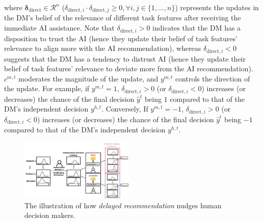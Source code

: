\documentclass[letterpaper]{article} %
\begin{document}
\noindent where $\bm{\delta}_{\text{direct}} \in \mathcal{R}^n$ ($\delta_{\text{direct},i} \cdot \delta_{\text{direct},j} \geq 0,  \forall i, j \in \{1, \dots, n\}
$) represents the updates in the DM's belief of the relevance of different task features after receiving the immediate AI assistance. Note that $\delta_{\text{direct},i}>0$ indicates that the DM has a disposition to trust the AI (hence they update their belief of task features' relevance to align more with the AI recommendation), whereas $\delta_{\text{direct},i}<0$  suggests that the DM has a tendency to distrust AI (hence they update their belief of task features' relevance to deviate more from the AI recommendation). $c^{m,t}$ moderates the magnitude of the update,
and $y^{m,t}$ controls the direction of the update. For example, if $y^{m,t} = 1$, $\delta_{\text{direct},i}>0$ (or $\delta_{\text{direct},i}<0$) increases (or decreases) the chance of the final decision $\hat{y}^t$ being $1$ compared to that of the DM's independent decision $y^{h, t}$.
Conversely,
If $y^{m,t} = -1$, $\delta_{\text{direct},i}>0$ (or $\delta_{\text{direct},i}<0$) increases (or decreases) the chance of the final decision $\hat{y}^t$ being $-1$
compared to that of the DM's independent decision $y^{h, t}$.
\begin{figure}[th]
    \centering
        \includegraphics[width=0.48\textwidth]{figures/two_step.png}

    \caption{The illustration of how {\em delayed recommendation} nudges human decision makers. }
    \label{fig:ill_two_step}
\end{figure}
\end{document}
